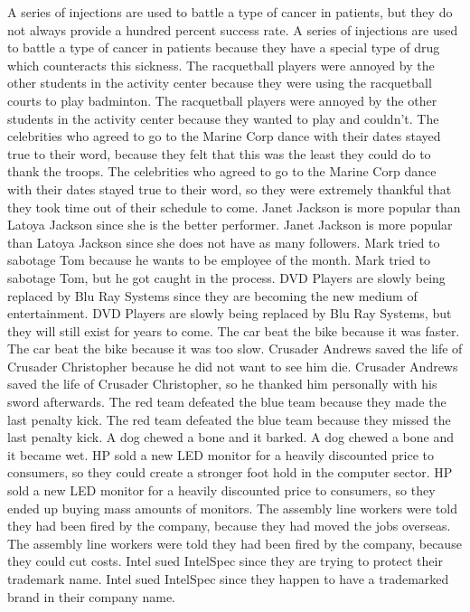 \documentclass{article}
\begin{document}
\begin{enumerate}
	A series of injections are used to battle a type of cancer in patients, but they do not always provide a hundred percent success rate.
	A series of injections are used to battle a type of cancer in patients because they have a special type of drug which counteracts this sickness.
	The racquetball players were annoyed by the other students in the activity center because they were using the racquetball courts to play badminton.
	The racquetball players were annoyed by the other students in the activity center because they wanted to play and couldn't.
	The celebrities who agreed to go to the Marine Corp dance with their dates stayed true to their word, because they felt that this was the least they could do to thank the troops.
	The celebrities who agreed to go to the Marine Corp dance with their dates stayed true to their word, so they were extremely thankful that they took time out of their schedule to come.
	Janet Jackson is more popular than Latoya Jackson since she is the better performer.
	Janet Jackson is more popular than Latoya Jackson since she does not have as many followers.
	Mark tried to sabotage Tom because he wants to be employee of the month.
	Mark tried to sabotage Tom, but he got caught in the process.
	DVD Players are slowly being replaced by Blu Ray Systems since they are becoming the new medium of entertainment.
	DVD Players are slowly being replaced by Blu Ray Systems, but they will still exist for years to come.
	The car beat the bike because it was faster.
	The car beat the bike because it was too slow.
	Crusader Andrews saved the life of Crusader Christopher because he did not want to see him die.
	Crusader Andrews saved the life of Crusader Christopher, so he thanked him personally with his sword afterwards.
	The red team defeated the blue team because they made the last penalty kick.
	The red team defeated the blue team because they missed the last penalty kick.
	A dog chewed a bone and it barked.
	A dog chewed a bone and it became wet.
	HP sold a new LED monitor for a heavily discounted price to consumers, so they could create a stronger foot hold in the computer sector.
	HP sold a new LED monitor for a heavily discounted price to consumers, so they ended up buying mass amounts of monitors.
	The assembly line workers were told they had been fired by the company, because they had moved the jobs overseas.
	The assembly line workers were told they had been fired by the company, because they could cut costs.
	Intel sued IntelSpec since they are trying to protect their trademark name.
	Intel sued IntelSpec since they happen to have a trademarked brand in their company name.

\end{enumerate}
\end{document}
